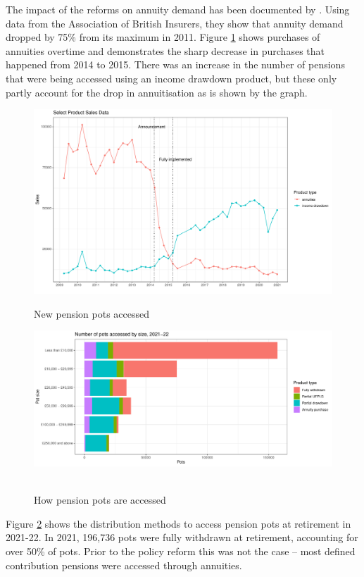 \documentclass[12pt]{article}
\begin{document}
The impact of the reforms on annuity demand has been documented by
\cite{cannon_et_al_nier_2016}. Using data from the Association of British
Insurers, they show that annuity demand dropped by 75\% from its maximum in
2011. Figure \ref{fig:annovertime} shows purchases of annuities overtime and
demonstrates the sharp decrease in purchases that happened from 2014 to 2015.
There was an increase in the number of pensions that were being accessed using
an income drawdown product, but these only partly account for the drop in
annuitisation as is shown by the graph.
\begin{figure}[h]
    \caption{New pension pots accessed }
    \centering
    \includegraphics[width=0.9\columnwidth]{figures/annuity_overtime.pdf}
    \label{fig:annovertime}
\end{figure}

\begin{figure}[h]
    \caption[Caption for LOF]{How pension pots are accessed\protect\footnotemark}
    \centering
    \includegraphics[width=0.9\columnwidth]{figures/annuity_pot_sizes.pdf}
    \label{fig:ann2122}
    \
\end{figure}
Figure \ref{fig:ann2122} shows the distribution methods to access pension pots
at retirement in 2021-22. In 2021, 196,736 pots were fully withdrawn at
retirement, accounting for over 50\% of pots. Prior to the policy reform this
was not the case -- most defined contribution pensions were accessed through
annuities.
\end{document}
